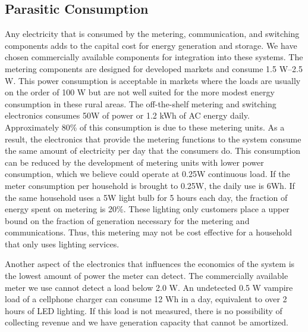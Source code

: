 \documentclass{sig-alternate}
\begin{document}
\subsection{Parasitic Consumption}
Any electricity that is consumed by the metering, communication, and 
switching components adds to the capital cost for energy generation and 
storage.
We have chosen commercially available components for integration into
these systems.  
The metering components are designed for developed markets
and consume 1.5 W--2.5 W.  
This power consumption is acceptable in markets where the loads are 
usually on the order of 100 W but are not well suited for the more modest
energy consumption in these rural areas.  
The off-the-shelf metering and switching electronics consumes 50W of power
or 1.2 kWh of AC energy daily.  
Approximately 80\% of this consumption is due to these metering units.
As a result, the electronics that provide the metering functions to the 
system consume the same amount of electricity per day that the consumers do.
This consumption can be reduced by the development of metering units with
lower power consumption, which we believe could operate at 0.25W 
continuous load.
If the meter consumption per household is brought to 0.25W, the daily
use is 6Wh.
If the same household uses a 5W light bulb for 5 hours each day, the fraction
of energy spent on metering is 20\%.
These lighting only customers place a upper bound on the fraction of generation
necessary for the metering and communications. 
Thus, this metering may not be cost effective for a household that only
uses lighting services.

Another aspect of the electronics that influences the economics of the system
is the lowest amount of power the meter can detect.
The commercially available meter we use cannot detect a load below 2.0 W.
An undetected 0.5 W vampire load of a
cellphone charger can consume 12 Wh in a day, equivalent to over 2 hours
of LED lighting.  
If this load is not measured, there
is no possibility of collecting revenue and we have generation capacity
that cannot be amortized.  
\end{document}
